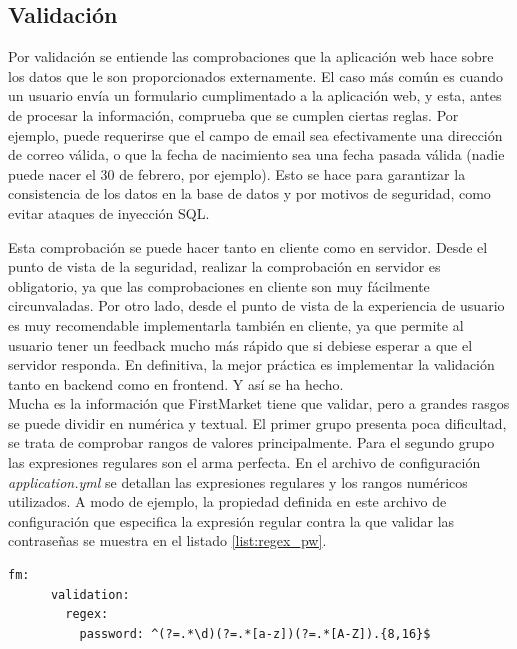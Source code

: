 \documentclass[a4paper]{article}
\begin{document}
    \subsection{Validación}
    Por validación se entiende las comprobaciones que la aplicación web hace sobre los datos que le son proporcionados externamente. El caso más común es cuando un usuario envía un formulario cumplimentado a la aplicación web, y esta, antes de procesar la información, comprueba que se cumplen ciertas reglas. Por ejemplo, puede requerirse que el campo de email sea efectivamente una dirección de correo válida, o que la fecha de nacimiento sea una fecha pasada válida (nadie puede nacer el 30 de febrero, por ejemplo). Esto se hace para garantizar la consistencia de los datos en la base de datos y por motivos de seguridad, como evitar ataques de inyección SQL.
    
    Esta comprobación se puede hacer tanto en cliente como en servidor. Desde el punto de vista de la seguridad, realizar la comprobación en servidor es obligatorio, ya que las comprobaciones en cliente son muy fácilmente circunvaladas. Por otro lado, desde el punto de vista de la experiencia de usuario es muy recomendable implementarla también en cliente, ya que permite al usuario tener un feedback mucho más rápido que si debiese esperar a que el servidor responda. En definitiva, la mejor práctica es implementar la validación tanto en backend como en frontend. Y así se ha hecho.
    \\
    
    Mucha es la información que FirstMarket tiene que validar, pero a grandes rasgos se puede dividir en numérica y textual. El primer grupo presenta poca dificultad, se trata de comprobar rangos de valores principalmente. Para el segundo grupo las expresiones regulares son el arma perfecta. En el archivo de configuración \emph{application.yml} se detallan las expresiones regulares y los rangos numéricos utilizados. A modo de ejemplo, la propiedad definida en este archivo de configuración que especifica la expresión regular contra la que validar las contraseñas se muestra en el listado \ref{list:regex_pw}.
    \\
     
    \begin{lstlisting}[caption=Expresión regular para las contraseñas,label=list:regex_pw]
    fm:
      validation:
        regex:
          password: ^(?=.*\d)(?=.*[a-z])(?=.*[A-Z]).{8,16}$
    \end{lstlisting}
    
\end{document}
